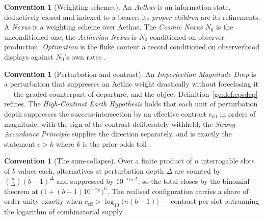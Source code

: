 \documentclass[11pt]{article}
\numberwithin{equation}{section}
\theoremstyle{plain}
\theoremstyle{definition}
\newtheorem{convention}[theorem]{Convention}
\theoremstyle{remark}
\begin{document}
\begin{convention}[Weighting schemes]\label{gc:conv:weightings}
An \emph{Aethus} is an information state, deductively closed and indexed
to a bearer; its \emph{proper children} are its refinements. A
\emph{Nexus} is a weighting scheme over Aethae. The \emph{Cosmic Nexus}
$N_0$ is the unconditioned one; the \emph{Aetherian Nexus} is $N_0$
conditioned on observer-production. \emph{Optimation} is the fluke
content a record conditioned on observerhood displays against $N_0$'s own
rates \cite{Aethus, Nexus}.
\end{convention}

\begin{convention}[Perturbation and contrast]\label{gc:conv:imd}
An \emph{Imperfection Magnitude Drop} is a perturbation that suppresses
an Aethic weight drastically without foreclosing it --- the graded
counterpart of departure, and the object
Definition~\ref{gc:def:epsdep} refines. The \emph{High-Contrast Earth
Hypothesis} holds that each unit of perturbation depth suppresses the
success-intersection by an effective contrast $c_{\mathrm{eff}}$ in
orders of magnitude, with the sign of the contrast deliberately withheld;
the \emph{Strong Accordance Principle} supplies the direction separately,
and is exactly the statement $c>k$ where $k$ is the prior-odds toll
\cite{Ben26Optimal}.
\end{convention}

\begin{convention}[The sum-collapse]\label{gc:conv:collapse}
Over a finite product of $n$ interrogable slots of $b$ values each,
alternatives at perturbation depth $\Delta$ are counted by
$\binom{n}{\Delta}(b-1)^{\Delta}$ and suppressed by
$10^{-c_{\mathrm{eff}}\Delta}$, so the total closes by the binomial
theorem at $\bigl(1+(b-1)10^{-c_{\mathrm{eff}}}\bigr)^{n}$. The realised
configuration carries a share of order unity exactly when
$c_{\mathrm{eff}}>\log_{10}\bigl(n(b-1)\bigr)$ --- contrast per slot
outrunning the logarithm of combinatorial supply \cite{Ben26Optimal}.
\end{convention}
\end{document}
